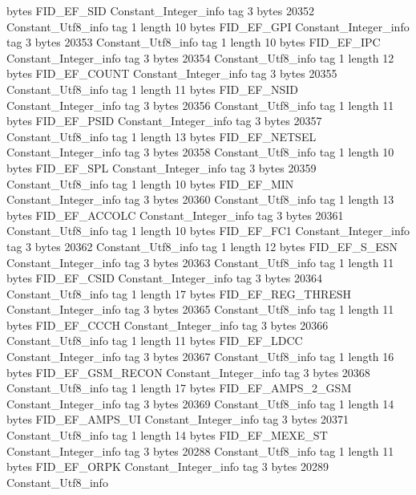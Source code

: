 {{{			bytes	FID_EF_SID
		}
		Constant_Integer_info {
			tag	3
			bytes	20352
		}
		Constant_Utf8_info {
			tag	1
			length	10
			bytes	FID_EF_GPI
		}
		Constant_Integer_info {
			tag	3
			bytes	20353
		}
		Constant_Utf8_info {
			tag	1
			length	10
			bytes	FID_EF_IPC
		}
		Constant_Integer_info {
			tag	3
			bytes	20354
		}
		Constant_Utf8_info {
			tag	1
			length	12
			bytes	FID_EF_COUNT
		}
		Constant_Integer_info {
			tag	3
			bytes	20355
		}
		Constant_Utf8_info {
			tag	1
			length	11
			bytes	FID_EF_NSID
		}
		Constant_Integer_info {
			tag	3
			bytes	20356
		}
		Constant_Utf8_info {
			tag	1
			length	11
			bytes	FID_EF_PSID
		}
		Constant_Integer_info {
			tag	3
			bytes	20357
		}
		Constant_Utf8_info {
			tag	1
			length	13
			bytes	FID_EF_NETSEL
		}
		Constant_Integer_info {
			tag	3
			bytes	20358
		}
		Constant_Utf8_info {
			tag	1
			length	10
			bytes	FID_EF_SPL
		}
		Constant_Integer_info {
			tag	3
			bytes	20359
		}
		Constant_Utf8_info {
			tag	1
			length	10
			bytes	FID_EF_MIN
		}
		Constant_Integer_info {
			tag	3
			bytes	20360
		}
		Constant_Utf8_info {
			tag	1
			length	13
			bytes	FID_EF_ACCOLC
		}
		Constant_Integer_info {
			tag	3
			bytes	20361
		}
		Constant_Utf8_info {
			tag	1
			length	10
			bytes	FID_EF_FC1
		}
		Constant_Integer_info {
			tag	3
			bytes	20362
		}
		Constant_Utf8_info {
			tag	1
			length	12
			bytes	FID_EF_S_ESN
		}
		Constant_Integer_info {
			tag	3
			bytes	20363
		}
		Constant_Utf8_info {
			tag	1
			length	11
			bytes	FID_EF_CSID
		}
		Constant_Integer_info {
			tag	3
			bytes	20364
		}
		Constant_Utf8_info {
			tag	1
			length	17
			bytes	FID_EF_REG_THRESH
		}
		Constant_Integer_info {
			tag	3
			bytes	20365
		}
		Constant_Utf8_info {
			tag	1
			length	11
			bytes	FID_EF_CCCH
		}
		Constant_Integer_info {
			tag	3
			bytes	20366
		}
		Constant_Utf8_info {
			tag	1
			length	11
			bytes	FID_EF_LDCC
		}
		Constant_Integer_info {
			tag	3
			bytes	20367
		}
		Constant_Utf8_info {
			tag	1
			length	16
			bytes	FID_EF_GSM_RECON
		}
		Constant_Integer_info {
			tag	3
			bytes	20368
		}
		Constant_Utf8_info {
			tag	1
			length	17
			bytes	FID_EF_AMPS_2_GSM
		}
		Constant_Integer_info {
			tag	3
			bytes	20369
		}
		Constant_Utf8_info {
			tag	1
			length	14
			bytes	FID_EF_AMPS_UI
		}
		Constant_Integer_info {
			tag	3
			bytes	20371
		}
		Constant_Utf8_info {
			tag	1
			length	14
			bytes	FID_EF_MEXE_ST
		}
		Constant_Integer_info {
			tag	3
			bytes	20288
		}
		Constant_Utf8_info {
			tag	1
			length	11
			bytes	FID_EF_ORPK
		}
		Constant_Integer_info {
			tag	3
			bytes	20289
		}
		Constant_Utf8_info {
}}}
